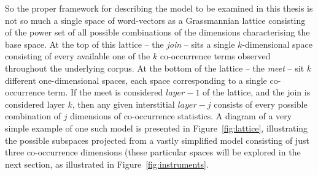 {So the proper framework for describing the model to be examined in this thesis is not so much a single space of word-vectors as a Grassmannian lattice consisting of the power set of all possible combinations of the dimensions characterising the base space.  At the top of this lattice -- the \emph{join} -- sits a single $k$-dimensional space consisting of every available one of the $k$ co-occurrence terms observed throughout the underlying corpus.  At the bottom of the lattice -- the \emph{meet} -- sit $k$ different one-dimensional spaces, each space corresponding to a single co-occurrence term.  If the meet is considered $layer-1$ of the lattice, and the join is considered layer $k$, then any given interstitial $layer-j$ consists of every possible combination of $j$ dimensions of co-occurrence statistics.  A diagram of a very simple example of one such model is presented in Figure~\ref{fig:lattice}, illustrating the possible subspaces projected from a vastly simplified model consisting of just three co-occurrence dimensions (these particular spaces will be explored in the next section, as illustrated in Figure~\ref{fig:instruments}.

}
